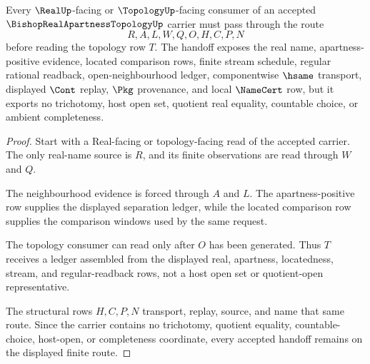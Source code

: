 \begin{theorem}
\label{thm:bishop-real-apartness-topology-real-seal}
Every $\RealUp$-facing or $\TopologyUp$-facing consumer of an accepted $\BishopRealApartnessTopologyUp$ carrier must pass through the route
$$
R,A,L,W,Q,O,H,C,P,N
$$
before reading the topology row $T$. The handoff exposes the real name, apartness-positive evidence, located comparison rows, finite stream schedule, regular rational readback, open-neighbourhood ledger, componentwise $\hsame$ transport, displayed $\Cont$ replay, $\Pkg$ provenance, and local $\NameCert$ row, but it exports no trichotomy, host open set, quotient real equality, countable choice, or ambient completeness.
\end{theorem}
\begin{proof}
Start with a Real-facing or topology-facing read of the accepted carrier. The only real-name source is $R$, and its finite observations are read through $W$ and $Q$.

The neighbourhood evidence is forced through $A$ and $L$. The apartness-positive row supplies the displayed separation ledger, while the located comparison row supplies the comparison windows used by the same request.

The topology consumer can read only after $O$ has been generated. Thus $T$ receives a ledger assembled from the displayed real, apartness, locatedness, stream, and regular-readback rows, not a host open set or quotient-open representative.

The structural rows $H,C,P,N$ transport, replay, source, and name that same route. Since the carrier contains no trichotomy, quotient equality, countable-choice, host-open, or completeness coordinate, every accepted handoff remains on the displayed finite route.
\end{proof}



